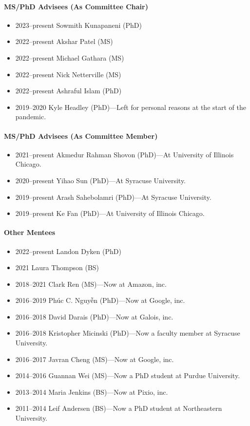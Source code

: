 \paragraph{MS/PhD Advisees (As Committee Chair)}
\begin{itemize}
\vspace{0.15cm}\item 2023--present Sowmith Kunapaneni (PhD)
\item 2022--present Akshar Patel (MS)
\item 2022--present Michael Gathara (MS)
\item 2022--present Nick Netterville (MS)
\item 2022--present Ashraful Islam (PhD)
\item 2019--2020 Kyle Headley (PhD)---Left for personal reasons at the start of the pandemic.
\end{itemize}
\paragraph{MS/PhD Advisees (As Committee Member)}
\begin{itemize}
\vspace{0.15cm}\item 2021--present Akmedur Rahman Shovon (PhD)---At University of Illinois Chicago.
\item 2020--present Yihao Sun (PhD)---At Syracuse University.
\item 2019--present Arash Sahebolamri (PhD)---At Syracuse University.
\item 2019--present Ke Fan (PhD)---At University of Illinois Chicago.
\end{itemize}
\paragraph{Other Mentees}
\begin{itemize}
\vspace{0.15cm}\item 2022--present Landon Dyken (PhD)
\item 2021 Laura Thompson (BS)
\item 2018--2021 Clark Ren (MS)---Now at Amazon, inc.
\item 2016--2019 Phúc C. Nguyễn (PhD)---Now at Google, inc.
\item 2016--2018 David Darais (PhD)---Now at Galois, inc.
\item 2016--2018 Kristopher Micinski (PhD)---Now a faculty member at Syracuse University.
\item 2016--2017 Javran Cheng (MS)---Now at Google, inc.
\item 2014--2016 Guannan Wei (MS)---Now a PhD student at Purdue University.
\item 2013--2014 Maria Jenkins (BS)---Now at Pixio, inc.
\item 2011--2014 Leif Andersen (BS)---Now a PhD student at Northeastern University.
\end{itemize}
